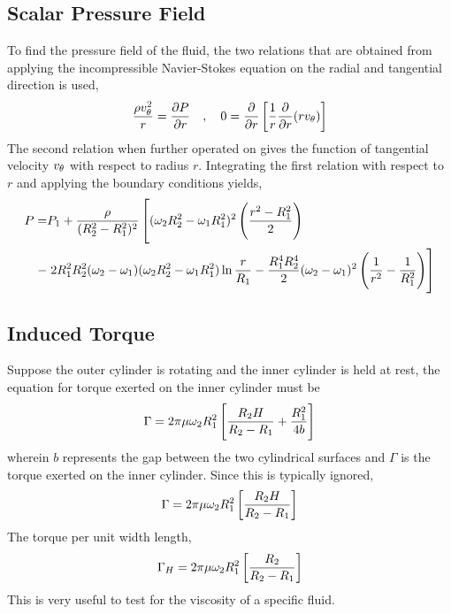 \documentclass[class=report, 12pt, crop=false]{standalone}
\begin{document}
\begin{center}
\subsection{Scalar Pressure Field}
\begin{comment}
\end{comment}
To find the pressure field of the fluid, the two relations that are obtained from applying the incompressible Navier-Stokes equation on the radial and tangential direction is used,
$$\frac{\rho v_\theta^2}{r} = \frac{\partial P}{\partial r}\quad,\quad0 = \frac{\partial}{\partial r}\left[\frac{1}{r}\frac{\partial}{\partial r}(rv_\theta)\right]$$
The second relation when further operated on gives the function of tangential velocity $v_\theta$ with respect to radius $r$. Integrating the first relation with respect to $r$ and applying the boundary conditions yields,
\begin{equation*}
\begin{split}
P =& P_1 + \frac{\rho}{(R_2^2-R_1^2)^2}\left[(\omega_2R_2^2 - \omega_1R_1^2)^2\left(\frac{r^2 - R_1^2}{2}\right)\right.{}\\
- &\left.{} 2R_1^2R_2^2(\omega_2-\omega_1)(\omega_2R_2^2 - \omega_1R_1^2)\ln\frac{r}{R_1} - \frac{R_1^4R_2^4}{2}(\omega_2-\omega_1)^2\left(\frac{1}{r^2} - \frac{1}{R_1^2}\right)\right]
\end{split}
\end{equation*}
\subsection{Induced Torque}
\begin{comment}
\end{comment}
Suppose the outer cylinder is rotating and the inner cylinder is held at rest, the equation for torque exerted on the inner cylinder must be
$$\Gamma = 2\pi\mu\omega_2R_1^2\left[\frac{R_2H}{R_2-R_1} + \frac{R_1^2}{4b}\right]$$
wherein $b$ represents the gap between the two cylindrical surfaces and $\Gamma$ is the torque exerted on the inner cylinder. Since this is typically ignored,
$$\Gamma = 2\pi\mu\omega_2R_1^2\left[\frac{R_2H}{R_2-R_1}\right]$$
The torque per unit width length,
$$\Gamma_H = 2\pi\mu\omega_2R_1^2\left[\frac{R_2}{R_2-R_1}\right]$$
This is very useful to test for the viscosity of a specific fluid.
\end{center}
\end{document}
